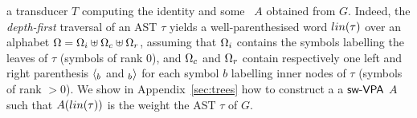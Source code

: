a transducer $T$ computing the identity and some \SWVPA~$A$
obtained from $G$. %
%
%
Indeed, the \emph{depth-first} traversal of an AST $\tau$
yields a well-parenthesised word $\lin(\tau)$ over an alphabet
$\Omega = \Omegai \uplus \Omegac \uplus \Omegar$,
assuming \eg that $\Omegai$ contains the symbols labelling the leaves of $\tau$ (symbols of rank $0$),
and $\Omegac$ and $\Omegar$ contain respectively one left and right parenthesis
$\langle_{b}$ and $_{b}{\rangle}$ for each symbol $b$ labelling inner nodes of $\tau$ (symbols of rank $>0$).
%
%
We show in Appendix~\ref{sec:trees} how to construct a
a $\textsf{sw-VPA}$ $A$ such that $A(\lin(\tau))$ is the weight the AST $\tau$ of $G$.

%
%
%
%
%
%

